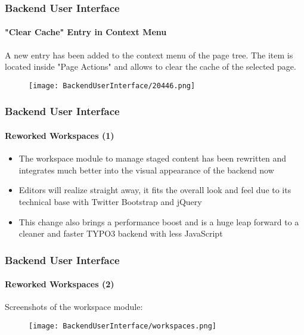 \begin{frame}[fragile]
	\frametitle{Backend User Interface}
	\framesubtitle{"Clear Cache" Entry in Context Menu}

	A new entry has been added to the context menu of the page tree. The item is located inside "Page Actions"
	and allows to clear the cache of the selected page.

	\begin{figure}
		\texttt{[image: BackendUserInterface/20446.png]}
	\end{figure}

\end{frame}

\begin{frame}[fragile]
	\frametitle{Backend User Interface}
	\framesubtitle{Reworked Workspaces (1)}

	\begin{itemize}

		\item The workspace module to manage staged content has been rewritten and
			integrates much better into the visual appearance of the backend now

		\item Editors will realize straight away, it fits the overall look and feel
			due to its technical base with Twitter Bootstrap and jQuery

		\item This change also brings a performance boost and is a huge leap forward
			to a cleaner and faster TYPO3 backend with less JavaScript

	\end{itemize}

\end{frame}

\begin{frame}[fragile]
	\frametitle{Backend User Interface}
	\framesubtitle{Reworked Workspaces (2)}

	Screenshots of the workspace module:

	\begin{figure}
		\texttt{[image: BackendUserInterface/workspaces.png]}
	\end{figure}

\end{frame}

